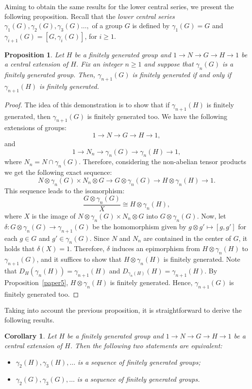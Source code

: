 \documentclass[12pt,reqno]{amsart}
\newtheorem{proposition}[subsection]{Proposition}
\newtheorem{corollary}[subsection]{Corollary}
\theoremstyle{definition}
\numberwithin{equation}{section}
\theoremstyle{definition}
\def\de{\delta}
\begin{document}
Aiming to obtain the same results for the lower central series, we present the following proposition. Recall that the \emph{lower central series} $\gamma_1(G), \gamma_2(G), \gamma_3(G) \dots,$
of a group $G$ is defined by $\gamma_1(G)=G$ and $\gamma_{i+1}(G)=[G, \gamma_i(G)]$, for $i\geq 1$.

\begin{proposition} \label{prop3}
Let $H$ be a finitely generated group and $1\to N \to G \to H \to 1$ be a central extension of $H$. Fix an integer $n\geq 1$ and suppose that $\gamma_n(G)$ is a finitely
generated group. Then, $\gamma_{n+1}(G)$ is finitely generated if and only if $\gamma_{n+1}(H)$ is finitely generated.
\end{proposition}
\begin{proof} The idea of this demonstration is to show that if  $\gamma_{n+1}(H)$ is finitely generated, then $\gamma_{n+1}(G)$ is finitely generated too. We have the following extensions
of groups:
\[
1\to N \to G \to H \to 1 ,
\]
and
\[
1\to N_n \to \gamma_n(G) \to \gamma_n(H) \to 1,
\]
where $N_n = N\cap \gamma_n(G)$. Therefore, considering the non-abelian tensor products we get the following exact sequence:
\[
N\otimes \gamma_n(G) \times N_n\otimes G \to G\otimes \gamma_n(G) \to H\otimes \gamma_n(H) \to 1 .
\]
This sequence leads to the isomorphism:
\[
\frac{ G\otimes \gamma_n(G)}{X} \cong  H\otimes \gamma_n(H),
\]
where $X$ is the image of $N\otimes \gamma_n(G) \times N_n\otimes G$ into $G\otimes \gamma_n(G)$. Now, let
$\de \colon G\otimes \gamma_n(G)\to \gamma_{n+1}(G)$ be the homomorphism given by $g\otimes g' \mapsto [g, g']$ for
each $g\in G$ and $g' \in \gamma_{n}(G)$. Since $N$ and $N_n$ are contained in the center of $G$, it holds that $\de (X)=1$. Therefore, $\de$ induces an epimorphism
from $ H\otimes \gamma_n(H)$ to $\gamma_{n+1}(G)$, and it suffices to show that $H\otimes \gamma_n (H)$ is finitely generated. Note that
$D_{H}(\gamma_n(H))=\gamma_{n+1}(H)$ and $D_{\gamma_n (H)}(H)=\gamma_{n+1}(H)$. By Proposition~\ref{paper5}, $H\otimes \gamma_n (H)$ is
finitely generated. Hence, $\gamma_{n+1}(G)$ is finitely generated too.
\end{proof}

Taking into account the previous proposition, it is straightforward to derive the following results.

\begin{corollary}
Let $H$ be a finitely generated group and $1\to N \to G \to H \to 1$ be a central extension of $H$. Then the following two statements are equivalent:
\begin{itemize}
  \item[(i)] $\gamma_2(H), \gamma_3(H), \dots$ is a sequence of finitely generated groups;
  \item[(ii)] $\gamma_2(G), \gamma_3(G), \dots$ is a sequence of finitely generated groups.
\end{itemize}
\end{corollary}
\end{document}
